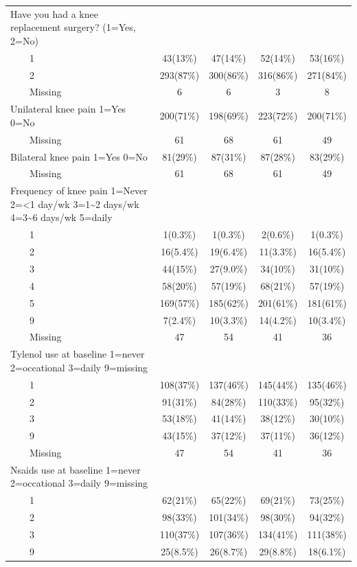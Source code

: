\documentclass{article}
\begin{document}
\begin{table}[!t]
\begin{tabular*}{\linewidth}{@{\extracolsep{\fill}}lcccc}
Have you had a knee replacement surgery? (1=Yes, 2=No) &  &  &  &  \\ 
    1 & 43(13\%) & 47(14\%) & 52(14\%) & 53(16\%) \\ 
    2 & 293(87\%) & 300(86\%) & 316(86\%) & 271(84\%) \\ 
    Missing & 6 & 6 & 3 & 8 \\ 
Unilateral knee pain 1=Yes 0=No & 200(71\%) & 198(69\%) & 223(72\%) & 200(71\%) \\ 
    Missing & 61 & 68 & 61 & 49 \\ 
Bilateral knee pain 1=Yes 0=No & 81(29\%) & 87(31\%) & 87(28\%) & 83(29\%) \\ 
    Missing & 61 & 68 & 61 & 49 \\ 
Frequency of knee pain 1=Never 2=<1 day/wk 3=1\textasciitilde{}2 days/wk 4=3\textasciitilde{}6 days/wk 5=daily &  &  &  &  \\ 
    1 & 1(0.3\%) & 1(0.3\%) & 2(0.6\%) & 1(0.3\%) \\ 
    2 & 16(5.4\%) & 19(6.4\%) & 11(3.3\%) & 16(5.4\%) \\ 
    3 & 44(15\%) & 27(9.0\%) & 34(10\%) & 31(10\%) \\ 
    4 & 58(20\%) & 57(19\%) & 68(21\%) & 57(19\%) \\ 
    5 & 169(57\%) & 185(62\%) & 201(61\%) & 181(61\%) \\ 
    9 & 7(2.4\%) & 10(3.3\%) & 14(4.2\%) & 10(3.4\%) \\ 
    Missing & 47 & 54 & 41 & 36 \\ 
Tylenol use at baseline 1=never 2=occational 3=daily 9=missing &  &  &  &  \\ 
    1 & 108(37\%) & 137(46\%) & 145(44\%) & 135(46\%) \\ 
    2 & 91(31\%) & 84(28\%) & 110(33\%) & 95(32\%) \\ 
    3 & 53(18\%) & 41(14\%) & 38(12\%) & 30(10\%) \\ 
    9 & 43(15\%) & 37(12\%) & 37(11\%) & 36(12\%) \\ 
    Missing & 47 & 54 & 41 & 36 \\ 
Nsaids use at baseline 1=never 2=occational 3=daily 9=missing &  &  &  &  \\ 
    1 & 62(21\%) & 65(22\%) & 69(21\%) & 73(25\%) \\ 
    2 & 98(33\%) & 101(34\%) & 98(30\%) & 94(32\%) \\ 
    3 & 110(37\%) & 107(36\%) & 134(41\%) & 111(38\%) \\ 
    9 & 25(8.5\%) & 26(8.7\%) & 29(8.8\%) & 18(6.1\%) \\ 

\end{tabular*}
\end{table}
\end{document}
